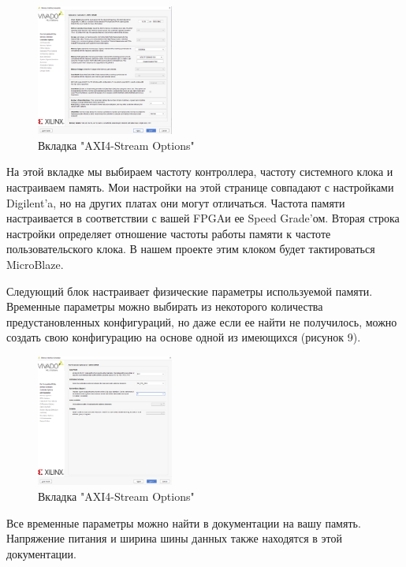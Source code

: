 \documentclass[a4paper,oneside ,14pt]{extreport}
\begin{document}
\begin{figure}[h]
	\centering
	\includegraphics[width=0.4\textwidth]{image/mig_4.png}
	\caption{Вкладка "AXI4-Stream Options"}
	\label{cordic_axi4_stream_options}
\end{figure}

На этой вкладке мы выбираем частоту контроллера, частоту системного клока и настраиваем память. Мои настройки на этой странице совпадают с настройками Digilent’a, но на других платах они могут отличаться. Частота памяти настраивается в соответствии с вашей FPGAи ее Speed Grade’ом. Вторая строка настройки определяет отношение частоты работы памяти к частоте пользовательского клока. В нашем проекте этим клоком будет тактироваться MicroBlaze.

Следующий блок настраивает физические параметры используемой памяти. Временные параметры можно выбирать из некоторого количества предустановленных конфигураций, но даже если ее найти не получилось, можно создать свою конфигурацию на основе одной из имеющихся (рисунок 9).

\begin{figure}[h]
	\centering
	\includegraphics[width=0.4\textwidth]{image/mig_5.png}
	\caption{Вкладка "AXI4-Stream Options"}
	\label{cordic_axi4_stream_options}
\end{figure}

Все временные параметры можно найти в документации на вашу память. Напряжение питания и ширина шины данных также находятся в этой документации.
\end{document}
